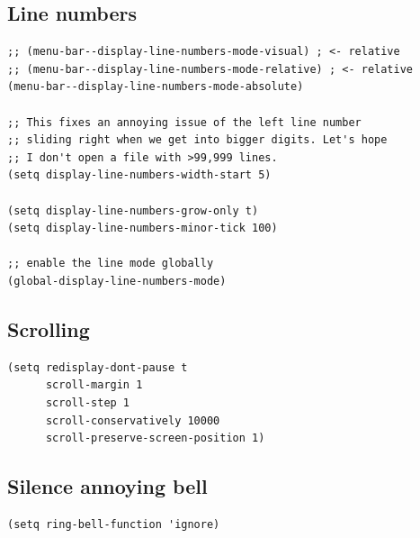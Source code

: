 \documentclass[10pt]{article}
\begin{document}
\subsection{Line numbers}
\label{sec:orgb4b7034}
\begin{verbatim}
;; (menu-bar--display-line-numbers-mode-visual) ; <- relative
;; (menu-bar--display-line-numbers-mode-relative) ; <- relative
(menu-bar--display-line-numbers-mode-absolute)

;; This fixes an annoying issue of the left line number
;; sliding right when we get into bigger digits. Let's hope
;; I don't open a file with >99,999 lines.
(setq display-line-numbers-width-start 5)

(setq display-line-numbers-grow-only t)
(setq display-line-numbers-minor-tick 100)

;; enable the line mode globally
(global-display-line-numbers-mode)
\end{verbatim}
\subsection{Scrolling}
\label{sec:orgf4c3cc1}
\begin{verbatim}
(setq redisplay-dont-pause t
      scroll-margin 1
      scroll-step 1
      scroll-conservatively 10000
      scroll-preserve-screen-position 1)
\end{verbatim}
\subsection{Silence annoying bell}
\label{sec:org604dbdd}
\begin{verbatim}
(setq ring-bell-function 'ignore)
\end{verbatim}
\end{document}
